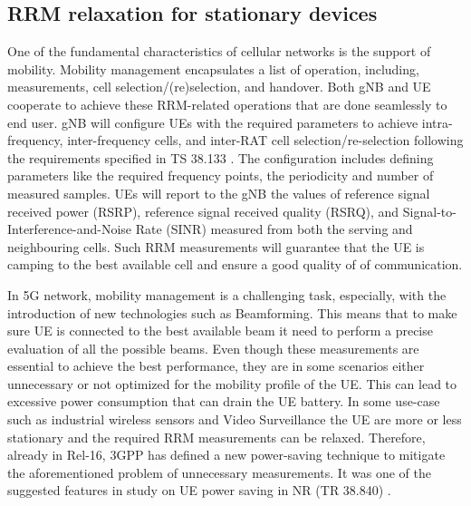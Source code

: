 \documentclass[conference]{IEEEtran}
\begin{document}
\subsection{RRM relaxation for stationary devices}
\label{sec:5-2}



One of the fundamental characteristics of cellular networks is the support of mobility. Mobility management encapsulates a list of operation, including, measurements, cell selection/(re)selection, and handover. Both gNB and UE cooperate to achieve these RRM-related operations that are done seamlessly to end user. gNB will configure UEs with the required parameters to achieve intra-frequency, inter-frequency cells, and inter-RAT cell selection/re-selection following the requirements specified in TS 38.133 \cite{3gpp.38.133}. The configuration includes defining parameters like the required frequency points, the periodicity and number of measured samples. UEs will report to the gNB the values of reference signal received power (RSRP), reference signal received quality (RSRQ), and Signal-to-Interference-and-Noise Rate (SINR) measured from both the serving and neighbouring cells. Such RRM measurements will guarantee that the UE is camping to the best available cell and ensure a good quality of of communication.

In 5G network, mobility management is a challenging task, especially, with the introduction of new technologies such as Beamforming. This means that to make sure UE is connected to the best available beam it need to perform a precise evaluation of all the possible beams. Even though these measurements are essential to achieve the best performance, they are in some scenarios either unnecessary or not optimized for the mobility profile of the UE. This can lead to excessive power consumption that can drain the UE battery. In some use-case such as industrial wireless sensors and Video Surveillance the UE are more or less stationary and the required RRM measurements can be relaxed.
Therefore, already in Rel-16, 3GPP has defined a new power-saving technique to mitigate the aforementioned problem of unnecessary measurements. It was one of the suggested features in study on UE power saving in NR (TR 38.840) \cite{3gpp.38.840}.
\end{document}
